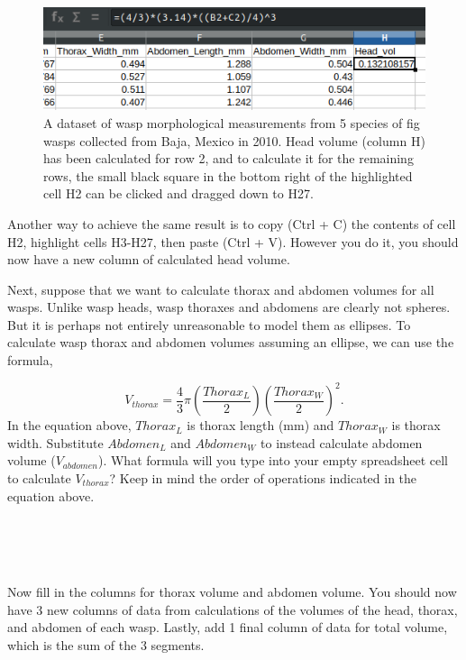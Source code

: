 \documentclass[
]{scrbook}
\begin{document}
\begin{figure}
\includegraphics[width=1\linewidth]{img/Ch1_Ex3_copy_formula} \caption{A dataset of wasp morphological measurements from 5 species of fig wasps collected from Baja, Mexico in 2010. Head volume (column H) has been calculated for row 2, and to calculate it for the remaining rows, the small black square in the bottom right of the highlighted cell H2 can be clicked and dragged down to H27.}\label{fig:unnamed-chunk-17}
\end{figure}

Another way to achieve the same result is to copy (Ctrl + C) the contents of cell H2, highlight cells H3-H27, then paste (Ctrl + V).
However you do it, you should now have a new column of calculated head volume.

Next, suppose that we want to calculate thorax and abdomen volumes for all wasps.
Unlike wasp heads, wasp thoraxes and abdomens are clearly not spheres.
But it is perhaps not entirely unreasonable to model them as ellipses.
To calculate wasp thorax and abdomen volumes assuming an ellipse, we can use the formula,

\[V_{thorax} = \frac{4}{3}\pi \left(\frac{Thorax_{L}}{2}\right)\left(\frac{Thorax_{W}}{2}\right)^{2}.\]
In the equation above, \(Thorax_{L}\) is thorax length (mm) and \(Thorax_{W}\) is thorax width.
Substitute \(Abdomen_{L}\) and \(Abdomen_{W}\) to instead calculate abdomen volume (\(V_{abdomen}\)).
What formula will you type into your empty spreadsheet cell to calculate \(V_{thorax}\)? Keep in mind the order of operations indicated in the equation above.

\begin{verbatim}




\end{verbatim}

Now fill in the columns for thorax volume and abdomen volume.
You should now have 3 new columns of data from calculations of the volumes of the head, thorax, and abdomen of each wasp.
Lastly, add 1 final column of data for total volume, which is the sum of the 3 segments.
\end{document}
